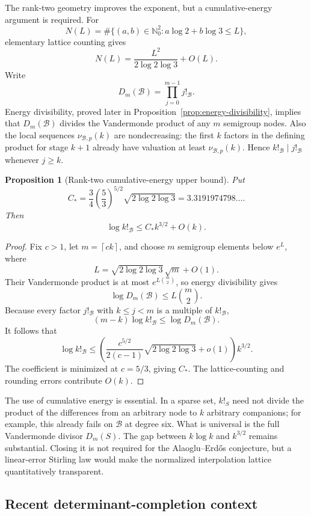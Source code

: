 \documentclass[11pt,oneside]{article}
\newtheorem{proposition}[theorem]{Proposition}
\theoremstyle{definition}
\theoremstyle{remark}
\newcommand{\Nzero}{\mathbb N_0}
\newcommand{\B}{\mathcal B}
\newcommand{\ceil}[1]{\left\lceil #1\right\rceil}
\begin{document}
The rank-two geometry improves the exponent, but a cumulative-energy argument is required.
For
\[
 N(L)=\#\{(a,b)\in\Nzero^2:a\log2+b\log3\le L\},
\]
elementary lattice counting gives
\[
 N(L)=\frac{L^2}{2\log2\log3}+O(L).
\]
Write
\[
 D_m(\B)=\prod_{j=0}^{m-1}j!_{\B}.
\]
Energy divisibility, proved later in Proposition~\ref{prop:energy-divisibility}, implies that
\(D_m(\B)\) divides the Vandermonde product of any \(m\) semigroup nodes.  Also the local
sequences \(\nu_{\B,p}(k)\) are nondecreasing: the first \(k\) factors in the defining product
for stage \(k+1\) already have valuation at least \(\nu_{\B,p}(k)\).  Hence
\(k!_{\B}\mid j!_{\B}\) whenever \(j\ge k\).

\begin{proposition}[Rank-two cumulative-energy upper bound]
\label{prop:k32}
Put
\[
 C_*=\frac34\left(\frac53\right)^{5/2}
       \sqrt{2\log2\log3}
 =3.3191974798\ldots.
\]
Then
\begin{equation}
 \log k!_{\B}\le C_*k^{3/2}+O(k).
 \label{eq:k32-upper}
\end{equation}
\end{proposition}

\begin{proof}
Fix \(c>1\), let \(m=\ceil{ck}\), and choose \(m\) semigroup elements below \(e^L\), where
\[
 L=\sqrt{2\log2\log3}\,\sqrt m+O(1).
\]
Their Vandermonde product is at most \(e^{L\binom m2}\), so energy divisibility gives
\[
 \log D_m(\B)\le L\binom m2.
\]
Because every factor \(j!_{\B}\) with \(k\le j<m\) is a multiple of \(k!_{\B}\),
\[
 (m-k)\log k!_{\B}\le\log D_m(\B).
\]
It follows that
\[
 \log k!_{\B}
 \le
 \left(\frac{c^{5/2}}{2(c-1)}\sqrt{2\log2\log3}+o(1)\right)k^{3/2}.
\]
The coefficient is minimized at \(c=5/3\), giving \(C_*\).  The lattice-counting and
rounding errors contribute \(O(k)\).
\end{proof}

The use of cumulative energy is essential.  In a sparse set, \(k!_S\) need not divide the
product of the differences from an arbitrary node to \(k\) arbitrary companions; for
example, this already fails on \(\B\) at degree six.  What is universal is the full
Vandermonde divisor \(D_m(S)\).  The gap between \(k\log k\) and \(k^{3/2}\) remains
substantial.  Closing it is not required for the Alaoglu--Erd\H{o}s conjecture, but a
linear-error Stirling law would make the normalized interpolation lattice quantitatively
transparent.

\subsection{Recent determinant-completion context}
\end{document}
